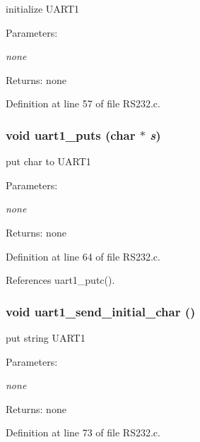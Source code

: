 initialize UART1 

\begin{Desc}
\item[Parameters:]
\begin{description}
\item[{\em none}]\end{description}
\end{Desc}
\begin{Desc}
\item[Returns:]none \end{Desc}


Definition at line 57 of file RS232.c.
\subsubsection{\setlength{\rightskip}{0pt plus 5cm}void uart1\_\-puts (char $\ast$ {\em s})}\label{_r_s232_8h_4da02067ec1624f7ecf49376d7ce1dca}


put char to UART1 

\begin{Desc}
\item[Parameters:]
\begin{description}
\item[{\em none}]\end{description}
\end{Desc}
\begin{Desc}
\item[Returns:]none \end{Desc}


Definition at line 64 of file RS232.c.

References uart1\_\-putc().
\subsubsection{\setlength{\rightskip}{0pt plus 5cm}void uart1\_\-send\_\-initial\_\-char ()}\label{_r_s232_8h_72c839f90335c8c3cb2103e11617b1b6}


put string UART1 

\begin{Desc}
\item[Parameters:]
\begin{description}
\item[{\em none}]\end{description}
\end{Desc}
\begin{Desc}
\item[Returns:]none \end{Desc}


Definition at line 73 of file RS232.c.